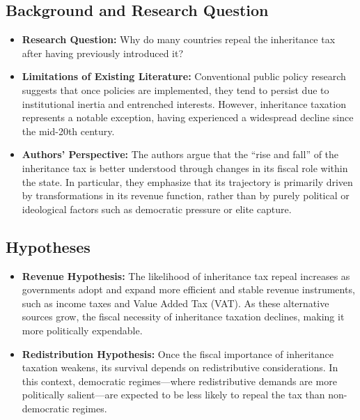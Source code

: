 \documentclass[12pt,letterpaper]{article}
\begin{document}
	\subsection{Background and Research Question}
	\begin{itemize}
		\item \textbf{Research Question:} Why do many countries repeal the inheritance tax after having previously introduced it? 
		
		\item \textbf{Limitations of Existing Literature:} Conventional public policy research suggests that once policies are implemented, they tend to persist due to institutional inertia and entrenched interests. However, inheritance taxation represents a notable exception, having experienced a widespread decline since the mid-20th century.
		
		\item \textbf{Authors' Perspective:} The authors argue that the “rise and fall” of the inheritance tax is better understood through changes in its fiscal role within the state. In particular, they emphasize that its trajectory is primarily driven by transformations in its revenue function, rather than by purely political or ideological factors such as democratic pressure or elite capture.
	\end{itemize}
	
	\subsection{Hypotheses}
	\begin{itemize}
		\item \textbf{Revenue Hypothesis:} The likelihood of inheritance tax repeal increases as governments adopt and expand more efficient and stable revenue instruments, such as income taxes and Value Added Tax (VAT). As these alternative sources grow, the fiscal necessity of inheritance taxation declines, making it more politically expendable.
		
		\item \textbf{Redistribution Hypothesis:} Once the fiscal importance of inheritance taxation weakens, its survival depends on redistributive considerations. In this context, democratic regimes—where redistributive demands are more politically salient—are expected to be less likely to repeal the tax than non-democratic regimes.
	\end{itemize}
	
\end{document}
